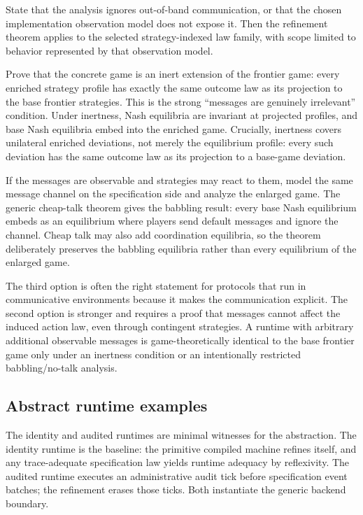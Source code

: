 \begin{description}[itemsep=2pt,leftmargin=1.2em,style=nextline]
\item[Closed-world assumption.]
  State that the analysis ignores out-of-band communication, or that the
  chosen implementation observation model does not expose it.  Then the
  refinement theorem applies to the selected strategy-indexed law family,
  with scope limited to behavior represented by that observation model.
\item[Inert extension.]
  Prove that the concrete game is an inert extension of the frontier
  game: every enriched strategy profile has exactly the same outcome law
  as its projection to the base frontier strategies.  This is the strong
  ``messages are genuinely irrelevant'' condition.  Under inertness,
  Nash equilibria are invariant at projected profiles, and base Nash
  equilibria embed into the enriched game.  Crucially, inertness covers
  unilateral enriched deviations, not merely the equilibrium profile:
  every such deviation has the same outcome law as its projection to a
  base-game deviation.
\item[Cheap-talk extension.]
  If the messages are observable and strategies may react to them, model
  the same message channel on the specification side and analyze the
  enlarged game.  The generic cheap-talk theorem gives the babbling
  result: every base Nash equilibrium embeds as an equilibrium where
  players send default messages and ignore the channel.  Cheap talk may
  also add coordination equilibria, so the theorem deliberately preserves
  the babbling equilibria rather than every equilibrium of the enlarged
  game.
\end{description}

The third option is often the right statement for protocols that run in
communicative environments because it makes the communication explicit.
The second option is stronger and requires a proof that messages cannot
affect the induced action law, even through contingent strategies.  A
runtime with arbitrary additional observable messages is
game-theoretically identical to the base frontier game only under an
inertness condition or an intentionally restricted babbling/no-talk
analysis.

\subsection{Abstract runtime examples}
\label{sec:ref:runtime-examples}

The identity and audited runtimes are minimal witnesses for the
abstraction.
The identity runtime is the baseline: the primitive compiled machine
refines itself, and any trace-adequate specification law yields runtime
adequacy by reflexivity.  The audited runtime executes an administrative
audit tick before specification event batches; the refinement erases
those ticks.  Both instantiate the generic backend boundary.

